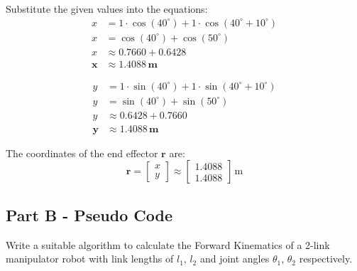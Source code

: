 \documentclass[11 pt , a 4 paper ]{article}
\theoremstyle{definition}
\begin{document}
Substitute the given values into the equations:
\begin{align*}
    x &= 1 \cdot \cos(40^\circ) + 1 \cdot \cos(40^\circ + 10^\circ) \\
    x &= \cos(40^\circ) + \cos(50^\circ) \\
    x &\approx 0.7660 + 0.6428 \\
    \mathbf{x} &\approx \mathbf{1.4088\,\text{m}}
\end{align*}

\begin{align*}
    y &= 1 \cdot \sin(40^\circ) + 1 \cdot \sin(40^\circ + 10^\circ) \\
    y &= \sin(40^\circ) + \sin(50^\circ) \\
    y &\approx 0.6428 + 0.7660 \\
    \mathbf{y} &\approx \mathbf{1.4088\,\text{m}}
\end{align*}


The coordinates of the end effector $\boldsymbol{r}$ are:
\[
\boldsymbol{r} = \begin{bmatrix} x \\ y \end{bmatrix} \approx \begin{bmatrix} 1.4088 \\ 1.4088 \end{bmatrix} \,\text{m}
\]
\subsection*{Part B - Pseudo Code}
Write a suitable algorithm to calculate the Forward Kinematics of a 2-link manipulator robot with link lengths of $l_1$, $l_2$ and joint angles $\theta_{1}$, $\theta_{2}$ respectively.
\end{document}
